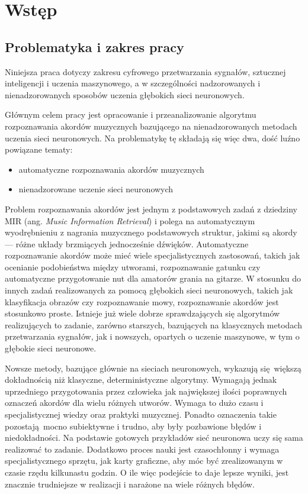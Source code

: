 \chapter{Wstęp} \label{chapter:introduction}



\section{Problematyka i zakres pracy}

Niniejsza praca dotyczy zakresu cyfrowego przetwarzania sygnałów, sztucznej inteligencji i uczenia maszynowego, a w szczególności nadzorowanych i nienadzorowanych sposobów uczenia głębokich sieci neuronowych.

Głównym celem pracy jest opracowanie i przeanalizowanie algorytmu rozpoznawania akordów muzycznych bazującego na nienadzorowanych metodach uczenia sieci neuronowych. Na problematykę tę składają się więc dwa, dość luźno powiązane tematy:
\begin{itemize}
    \item automatyczne rozpoznawania akordów muzycznych
    \item nienadzorowane uczenie sieci neuronowych
\end{itemize}

Problem rozpoznawania akordów jest jednym z podstawowych zadań z dziedziny MIR (ang. \emph{Music Information Retrieval}) i polega na automatycznym wyodrębnieniu z nagrania muzycznego podstawowych struktur, jakimi są akordy --- różne układy brzmiących jednocześnie dźwięków. Automatyczne rozpoznawanie akordów może mieć wiele specjalistycznych zastosowań, takich jak ocenianie podobieństwa między utworami, rozpoznawanie gatunku czy automatyczne przygotowanie nut dla amatorów grania na gitarze. W stosunku do innych zadań realizowanych za pomocą głębokich sieci neuronowych, takich jak klasyfikacja obrazów czy rozpoznawanie mowy, rozpoznawanie akordów jest stosunkowo proste. Istnieje już wiele dobrze sprawdzających się algorytmów realizujących to zadanie, zarówno starszych, bazujących na klasycznych metodach przetwarzania sygnałów, jak i nowszych, opartych o uczenie maszynowe, w tym o głębokie sieci neuronowe. 

Nowsze metody, bazujące głównie na sieciach neuronowych, wykazują się większą dokładnością niż klasyczne, deterministyczne algorytmy. Wymagają jednak uprzedniego przygotowania przez człowieka jak największej ilości poprawnych oznaczeń akordów dla wielu różnych utworów. Wymaga to dużo czasu i specjalistycznej wiedzy oraz praktyki muzycznej. Ponadto oznaczenia takie pozostają mocno subiektywne i trudno, aby były pozbawione błędów i niedokładności.  Na podstawie gotowych przykładów sieć neuronowa uczy się sama realizować to zadanie. Dodatkowo proces nauki jest czasochłonny i wymaga specjalistycznego sprzętu, jak karty graficzne, aby móc być zrealizowanym w czasie rzędu kilkunastu godzin. O ile więc podejście to daje lepsze wyniki, jest znacznie trudniejsze w realizacji i narażone na wiele różnych błędów.

